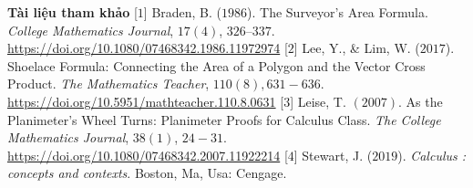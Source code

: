 \begin{multicols}{2}
		\vskip 0.1cm
		\textbf{\color{toanhocdoisong}Tài liệu tham khảo}
		\vskip 0.1cm
		[$1$] Braden, B. ($1986$). The Surveyor's Area Formula. \textit{College Mathematics Journal}, $17(4)$, $326–337$. \url{https://doi.org/10.1080/07468342.1986.11972974}
		\vskip 0.1cm
		[$2$] Lee, Y., \& Lim, W. ($2017$). Shoelace Formula: Connecting the Area of a Polygon and the Vector Cross Product. \textit{The Mathematics Teacher}, $110(8), 631-636$. \url{https://doi.org/10.5951/mathteacher.110.8.0631}
		\vskip 0.1cm
		[$3$] Leise, T. $(2007)$. As the Planimeter's Wheel Turns: Planimeter Proofs for Calculus Class. \textit{The College Mathematics Journal}, $38(1)$, $24-31$. \url{https://doi.org/10.1080/07468342.2007.11922214}
		\vskip 0.1cm
		[$4$] Stewart, J. ($2019$). \textit{Calculus : concepts and contexts}. Boston, Ma, Usa: Cengage.
\end{multicols}